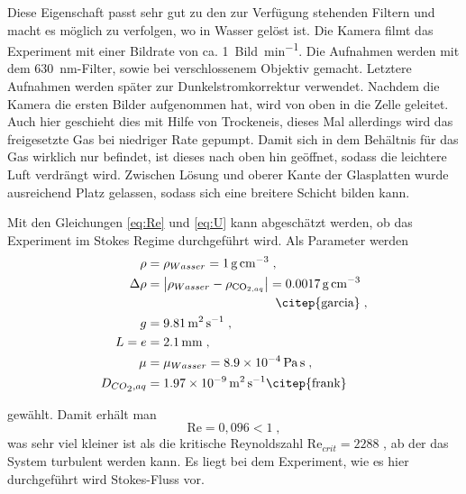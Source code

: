
Diese Eigenschaft passt sehr gut zu den zur Verfügung stehenden Filtern und macht es möglich zu verfolgen, wo \COT in Wasser gelöst ist.
Die Kamera filmt das Experiment mit einer Bildrate von ca. \SI{1}{Bild\per\minute}.  Die Aufnahmen werden mit dem \SI{630}{\nano\meter}-Filter, sowie bei verschlossenem Objektiv gemacht. Letztere Aufnahmen werden später zur Dunkelstromkorrektur verwendet.
Nachdem die Kamera die ersten Bilder aufgenommen hat, wird von oben \COT in die Zelle geleitet. Auch hier geschieht dies mit Hilfe von 
Trockeneis, dieses Mal allerdings wird das freigesetzte Gas bei niedriger Rate gepumpt. Damit sich in dem Behältnis für das Gas wirklich nur \COT befindet, ist dieses nach oben hin geöffnet, sodass die leichtere Luft verdrängt wird. Zwischen Lösung und oberer Kante der Glasplatten wurde ausreichend Platz gelassen, sodass sich eine breitere \COTm Schicht bilden kann.

Mit den Gleichungen \ref{eq:Re} und \ref{eq:U} kann abgeschätzt werden, ob das Experiment im Stokes Regime durchgeführt wird. Als Parameter werden 
\begin{align*}
  \rho &= \rho_{Wasser} = \SI{1}{\g\per\cubic\centi\meter} \; , \\ 
  \Delta\rho &= \left| \rho_{Wasser} - \rho_{\mathrm{CO}_{2, aq}} \right| = \SI[round-precision=4]{0,0017}{\gram\per\cubic\centi\meter} \\
  &\textbf{\hspace{3.6cm}}  \text{\citep{garcia}} \; , \\
  g &= \SI[round-precision=2]{9,81}{\meter\per\squared\second} \; , \\
  L = e &= \SI[round-precision=1]{2,1}{\milli\meter} \; , \\
  \mu &= \mu_{Wasser} = \SI{8,9e-4}{\pascal\second} \; , \\
  D_{\COTn , aq} &= \SI[round-precision=2]{1,97e-9}{\meter\squared\per\second} \text{\citep{frank}}
\end{align*}

gewählt. Damit erhält man
\begin{equation}
 \mathrm{Re} = 0,096 < 1 \; ,
\end{equation}
was sehr viel kleiner ist als die kritische Reynoldszahl $\mathrm{Re}_{crit} = 2288$ \citep{hanks}, ab der das System turbulent werden kann. Es liegt bei dem Experiment, wie es hier durchgeführt wird Stokes-Fluss vor.


